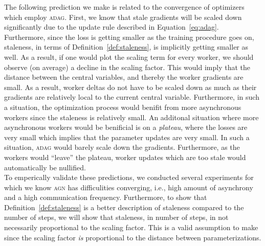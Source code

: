 The following prediction we make is related to the convergence of optimizers which employ \textsc{adag}. First, we know that stale gradients will be scaled down significantly due to the update rule described in Equation~\ref{eq:adag}. Furthermore, since the loss is getting smaller as the training procedure goes on, staleness, in terms of Definition~\ref{def:staleness}, is implicitly getting smaller as well. As a result, if one would plot the scaling term for every worker, we should observe (on average) a decline in the scaling factor. This would imply that the distance between the central variables, and thereby the worker gradients are small. As a result, worker deltas do not have to be scaled down as much as their gradients are relatively local to the current central variable. Furthermore, in such a situation, the optimization process would benifit from more asynchronous workers since the staleness is relatively small. An additonal situation where more asynchronous workers would be benificial is on a \emph{plateau}, where the losses are very small which implies that the parameter updates are very small. In such a situation, \textsc{adag} would barely scale down the gradients. Furthermore, as the workers would ``leave'' the plateau, worker updates which are too stale would automatically be nullified.\\

To emperically validate these predictions, we conducted several experiments for which we know \textsc{agn} has difficulities converging, i.e., high amount of asynchrony and a high communication frequency. Furthermore, to show that Definition~\ref{def:staleness} is a better description of staleness compared to the number of steps, we will show that staleness, in number of steps, in not necessarily proportional to the scaling factor. This is a valid assumption to make since the scaling factor \emph{is} proportional to the distance between parameterizations.

